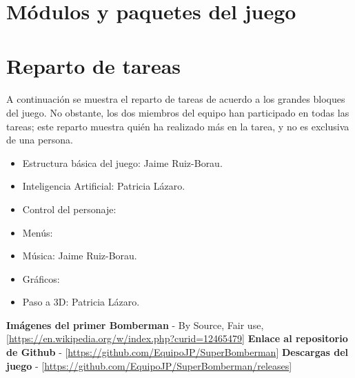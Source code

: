 \documentclass[a4paper]{article}
\begin{document}
\section{Módulos y paquetes del juego}
\newpage

\section{Reparto de tareas}

\paragraph{}A continuación se muestra el reparto de tareas de acuerdo a los grandes bloques del juego. No obstante, los dos miembros del equipo han participado en todas las tareas; este reparto muestra quién ha realizado más en la tarea, y no es exclusiva de una persona.

\begin{itemize}
\item Estructura básica del juego: Jaime Ruiz-Borau.
\item Inteligencia Artificial: Patricia Lázaro.
\item Control del personaje: 
\item Menús:
\item Música: Jaime Ruiz-Borau.
\item Gráficos:
\item Paso a 3D: Patricia Lázaro.
\end{itemize}
\newpage

\begin{thebibliography}{99}
	 \textbf{Imágenes del primer Bomberman} - By Source, Fair use, [\url{https://en.wikipedia.org/w/index.php?curid=12465479}]
	\bibitem{} \textbf{Enlace al repositorio de Github} - [\url{https://github.com/EquipoJP/SuperBomberman}]
	\bibitem{} \textbf{Descargas del juego} - [\url{https://github.com/EquipoJP/SuperBomberman/releases}]
\end{thebibliography}
\end{document}
